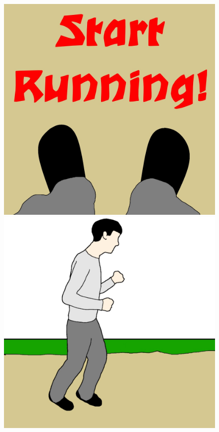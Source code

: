 \documentclass[twocolumn,showpacs,%
  nofootinbib,aps,superscriptaddress,%
  eqsecnum,prd,notitlepage,showkeys,10pt]{revtex4-1}
\begin{document}
\begin{figure}[!htb]
  \includegraphics[width=\linewidth]{graphics/Image(4).jpg}
\endminipage\hfill
{}
  \includegraphics[width=\linewidth]{graphics/Image(5).jpg}

\end{figure}
\end{document}
